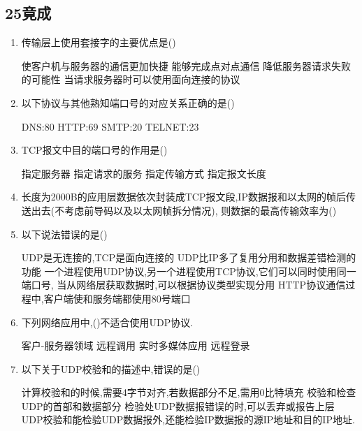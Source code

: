 \documentclass[12pt, a4paper, oneside, UTF8]{ctexbook}
\begin{document}
\subsection{25竟成}

\begin{enumerate}
    \item 传输层上使用套接字的主要优点是(\qquad) 
    \begin{choices}[1]
        \task 使客户机与服务器的通信更加快捷 
        \task 能够完成点对点通信
        \task 降低服务器请求失败的可能性
        \task 当请求服务器时可以使用面向连接的协议
    \end{choices}

    \item 以下协议与其他熟知端口号的对应关系正确的是(\qquad)
    \begin{choices}
        \task DNS:80
        \task HTTP:69
        \task SMTP:20
        \task TELNET:23
    \end{choices}

    \item TCP报文中目的端口号的作用是(\qquad)
    \begin{choices}
        \task 指定服务器
        \task 指定请求的服务
        \task 指定传输方式
        \task 指定报文长度
    \end{choices}

    \item 长度为2000B的应用层数据依次封装成TCP报文段,IP数据报和以太网的帧后传送出去(不考虑前导码以及以太网帧拆分情况),
    则数据的最高传输效率为(\qquad)
    
    \item 以下说法错误的是(\qquad)
    \begin{choices}[1]
        \task UDP是无连接的,TCP是面向连接的
        \task UDP比IP多了复用分用和数据差错检测的功能
        \task 一个进程使用UDP协议,另一个进程使用TCP协议,它们可以同时使用同一端口号,
        当从网络层获取数据时,可以根据协议类型实现分用
        \task HTTP协议通信过程中,客户端使和服务端都使用80号端口
    \end{choices}

    \item 下列网络应用中,(\qquad)不适合使用UDP协议. 
    \begin{choices}[2]
        \task 客户-服务器领域
        \task 远程调用
        \task 实时多媒体应用
        \task 远程登录
    \end{choices}

    \item 以下关于UDP校验和的描述中,错误的是(\qquad)
    \begin{choices}[1]
        \task 计算校验和的时候,需要4字节对齐,若数据部分不足,需用0比特填充
        \task 校验和检查UDP的首部和数据部分
        \task 检验处UDP数据报错误的时,可以丢弃或报告上层
        \task UDP校验和能检验UDP数据报外,还能检验IP数据报的源IP地址和目的IP地址.
    \end{choices}


\end{enumerate}
\end{document}
